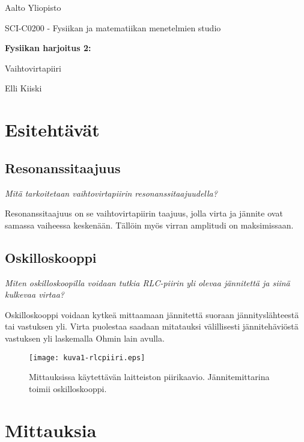 \documentclass[a4paper,11pt]{article}
\begin{document}
{
\thispagestyle{empty}

{\large
Aalto Yliopisto
\par
SCI-C0200 - Fysiikan ja matematiikan menetelmien studio
}

\vspace{7cm}

{\huge \bf
Fysiikan harjoitus 2: 
\par
Vaihtovirtapiiri}

\vspace{2cm}

{\Large Elli Kiiski}

\clearpage

\tableofcontents

\clearpage

\section{Esitehtävät}

\subsection{Resonanssitaajuus}

\textit{Mitä tarkoitetaan vaihtovirtapiirin resonanssitaajuudella?}

Resonanssitaajuus on se vaihtovirtapiirin taajuus, jolla virta ja jännite ovat samassa vaiheessa keskenään. Tällöin myös virran amplitudi on maksimissaan.

\subsection{Oskilloskooppi}

\textit{Miten oskilloskoopilla voidaan tutkia RLC-piirin yli olevaa jännitettä ja siinä kulkevaa virtaa?}

Oskilloskooppi voidaan kytkeä mittaamaan jännitettä suoraan jännityslähteestä tai vastuksen yli. Virta puolestaa saadaan mitatauksi välillisesti jännitehäviöstä vastuksen yli laskemalla Ohmin lain avulla.

\begin{figure}
    \centering
    \texttt{[image: kuva1-rlcpiiri.eps]}
    \caption{Mittauksissa käytettävän laitteiston piirikaavio. Jännitemittarina toimii oskilloskooppi.}
    \label{fig:rlcpiiri}
\end{figure}

\section{Mittauksia}

}
\end{document}
